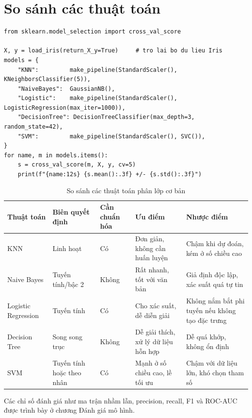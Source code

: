 \section{So sánh các thuật toán}

\begin{lstlisting}[caption={So sánh năm thuật toán bằng kiểm định chéo}]
from sklearn.model_selection import cross_val_score

X, y = load_iris(return_X_y=True)     # tro lai bo du lieu Iris
models = {
    "KNN":         make_pipeline(StandardScaler(), KNeighborsClassifier(5)),
    "NaiveBayes":  GaussianNB(),
    "Logistic":    make_pipeline(StandardScaler(), LogisticRegression(max_iter=1000)),
    "DecisionTree": DecisionTreeClassifier(max_depth=3, random_state=42),
    "SVM":         make_pipeline(StandardScaler(), SVC()),
}
for name, m in models.items():
    s = cross_val_score(m, X, y, cv=5)
    print(f"{name:12s} {s.mean():.3f} +/- {s.std():.3f}")
\end{lstlisting}

\begin{table}[H]
\centering
\small
\begin{tabular}{|p{2.4cm}|p{2cm}|p{2cm}|p{3.4cm}|p{3.4cm}|}
\hline
\textbf{Thuật toán} & \textbf{Biên quyết định} & \textbf{Cần chuẩn hóa} & \textbf{Ưu điểm} & \textbf{Nhược điểm} \\
\hline
KNN & Linh hoạt & Có & Đơn giản, không cần huấn luyện & Chậm khi dự đoán, kém ở số chiều cao \\ \hline
Naive Bayes & Tuyến tính/bậc 2 & Không & Rất nhanh, tốt với văn bản & Giả định độc lập, xác suất quá tự tin \\ \hline
Logistic Regression & Tuyến tính & Có & Cho xác suất, dễ diễn giải & Không nắm bắt phi tuyến nếu không tạo đặc trưng \\ \hline
Decision Tree & Song song trục & Không & Dễ giải thích, xử lý dữ liệu hỗn hợp & Dễ quá khớp, không ổn định \\ \hline
SVM & Tuyến tính hoặc theo nhân & Có & Mạnh ở số chiều cao, lề tối ưu & Chậm với dữ liệu lớn, khó chọn tham số \\ \hline
\end{tabular}
\caption{So sánh các thuật toán phân lớp cơ bản}
\end{table}

Các chỉ số đánh giá như ma trận nhầm lẫn, precision, recall, F1 và ROC-AUC được trình bày ở chương Đánh giá mô hình.

